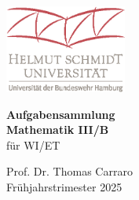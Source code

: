 





\thispagestyle{empty} 
\begin{center}
    \vspace*{2cm}
    \includegraphics[width=0.3\textwidth]{HSU_RGB.eps} %
\end{center}

\begin{center}
    \vspace{1cm}
    {\LARGE \textbf{Aufgabensammlung}}\\
    \vspace{0.5cm}
    {\LARGE \textbf{Mathematik III/B}} \\
    \vspace{0.5cm}
    {\large f\"ur WI/ET} \\
\end{center}


\vfill
\begin{center}
    {\large Prof. Dr. Thomas Carraro} \\
    {\large Fr\"uhjahrstrimester 2025}
\end{center}

\newpage
\thispagestyle{empty}
\mbox{}
\newpage
\tableofcontents
\newpage
\thispagestyle{empty}
\mbox{}
\newpage



% 
\renewcommand{\d }{\mathrm{d}}
\setcounter{page}{1}

